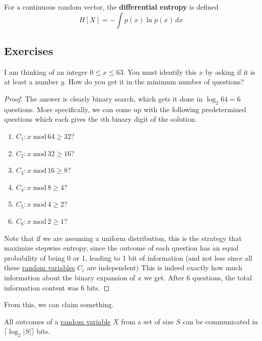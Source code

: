  \begin{definition}
    \label{def:differential-entropy}
    For a continuous random vector, the \textbf{differential entropy} is defined 
    \begin{equation}
      H[X] = - \int p(x) \ln{p(x)} \,dx
    \end{equation}
  \end{definition}

\subsection{Exercises}

  \begin{exercise}[63 Puzzle]
    I am thinking of an integer $0 \leq x \leq 63$. You must identify this $x$ by asking if it is at least a number $y$. How do you get it in the minimum number of questions? 
  \end{exercise}
  \begin{proof}
    The answer is clearly binary search, which gets it done in $\log_2 64 = 6$ questions. More specifically, we can come up with the following predetermined questions which each gives the $i$th binary digit of the solution. 
    \begin{enumerate}
      \item $C_1: x \; \mathrm{mod} \, 64 \geq 32$? 
      \item $C_2: x \; \mathrm{mod} \, 32 \geq 16$? 
      \item $C_3: x \; \mathrm{mod} \, 16 \geq 8$? 
      \item $C_4: x \; \mathrm{mod} \, 8 \geq 4$? 
      \item $C_5: x \; \mathrm{mod} \, 4 \geq 2$? 
      \item $C_6: x \; \mathrm{mod} \, 2 \geq 1$? 
    \end{enumerate}
    Note that if we are assuming a uniform distribution, this is the strategy that maximize stepwise entropy, since the outcome of each question has an equal probability of being $0$ or $1$, leading to 1 bit of information (and not less since all these \hyperref[prob-def:random-variable]{random variables} $C_i$ are independent) This is indeed exactly how much information about the binary expansion of $x$ we get. After 6 questions, the total information content was 6 bits. 
  \end{proof}

  From this, we can claim something. 

  \begin{lemma}
    \label{thm:fixed-length-codes-for-a-finite-alphabet}
    All outcomes of a \hyperref[prob-def:random-variable]{random variable} $X$ from a set of size $S$ can be communicated in $\lceil \log_2 |S| \rceil$ bits. 
  \end{lemma}

